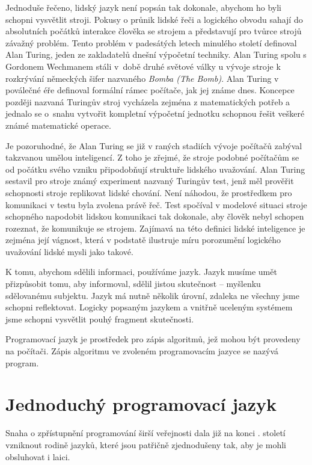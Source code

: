 \documentclass[10pt,twoside=true,open=right,cleardoublepage=empty,chapterprefix=true]{scrbook}
\newcommand{\oddil}[1]{\section{#1}\index{#1}\label{#1}}
\newcommand{\lnb}{\linebreak}
\begin{document}
\pagebreak

Jednoduše řečeno, lidský jazyk není popsán tak dokonale, abychom ho byli schopni vysvětlit stroji. Pokusy o průnik lidské řeči a logického \lnb obvodu sahají do absolutních počátků interakce člověka se strojem a představují pro tvůrce strojů závažný problém. Tento problém v padesátých letech minulého století definoval Alan Turing, jeden ze zakladatelů dnešní výpočetní techniky. Alan Turing spolu s Gordonem Wechmanem stáli \lnb v~době druhé světové války u vývoje stroje k rozkrývání německých šifer nazvaného {\em Bomba (The Bomb)}. Alan Turing v poválečné éře definoval formální rámec počítače, jak jej známe dnes. Koncepce později nazvaná Turingův stroj vycházela zejména z matematických potřeb a jednalo se o~snahu vytvořit kompletní výpočetní jednotku schopnou řešit veškeré známé matematické operace.  


Je pozoruhodné, že Alan Turing se již v raných stadiích vývoje počítačů zabýval takzvanou umělou inteligencí. Z toho je zřejmé, že stroje podobné počítačům se od počátku svého vzniku připodobňují struktuře lidského uvažování. Alan Turing sestavil pro stroje známý experiment nazvaný Turingův test, jenž měl prověřit schopnosti stroje replikovat lidské chování. Není náhodou, že prostředkem pro komunikaci v testu byla zvolena právě řeč. Test spočíval v modelové situaci stroje schopného napodobit lidskou komunikaci tak dokonale, aby člověk nebyl schopen rozeznat, že komunikuje se strojem. Zajímavá na této definici lidské inteligence je zejména její vágnost, která v podstatě ilustruje míru porozumění logického uvažování lidské mysli jako takové.

K tomu, abychom sdělili informaci, používáme jazyk. Jazyk musíme umět přizpůsobit tomu, aby informoval, sdělil jistou skutečnost -- myšlenku sdělovanému subjektu. Jazyk má nutně několik úrovní, zdaleka ne všechny jsme schopni reflektovat. Logicky popsaným jazykem a vnitřně uceleným systémem jsme schopni vysvětlit pouhý fragment skutečnosti.

Programovací jazyk je prostředek pro zápis algoritmů, jež mohou být provedeny na počítači. Zápis algoritmu ve zvoleném programovacím \lnb jazyce se nazývá program.





\oddil{Jednoduchý programovací jazyk}

Snaha o zpřístupnění programování širší veřejnosti dala již na konci \lnb 20. století vzniknout rodině jazyků, které jsou patřičně zjednodušeny tak, aby je mohli obsluhovat i laici.
\end{document}
